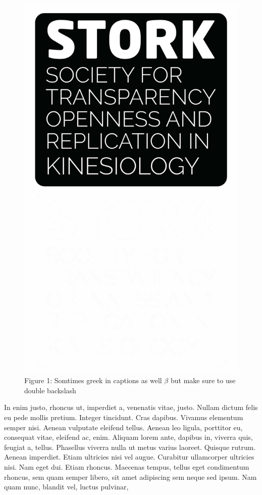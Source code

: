 \documentclass[]{cik}%
\begin{document}
\begin{figure}[H]

{\centering \includegraphics[width=1\textwidth,height=\textheight]{STORK_overlay_blk.pdf}

}

\caption{Figure 1: Somtimes greek in captions as well \(\beta\) but make
sure to use double backslash}

\end{figure}

In enim justo, rhoncus ut, imperdiet a, venenatis vitae, justo. Nullam
dictum felis eu pede mollis pretium. Integer tincidunt. Cras dapibus.
Vivamus elementum semper nisi. Aenean vulputate eleifend tellus. Aenean
leo ligula, porttitor eu, consequat vitae, eleifend ac, enim. Aliquam
lorem ante, dapibus in, viverra quis, feugiat a, tellus. Phasellus
viverra nulla ut metus varius laoreet. Quisque rutrum. Aenean imperdiet.
Etiam ultricies nisi vel augue. Curabitur ullamcorper ultricies nisi.
Nam eget dui. Etiam rhoncus. Maecenas tempus, tellus eget condimentum
rhoncus, sem quam semper libero, sit amet adipiscing sem neque sed
ipsum. Nam quam nunc, blandit vel, luctus pulvinar,
\end{document}
